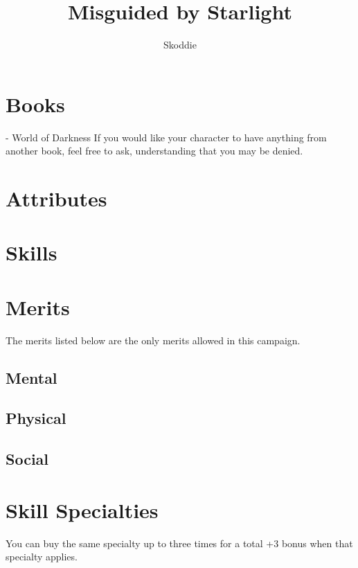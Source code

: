 \documentclass{article}
\title{Misguided by Starlight}
\author{Skoddie}
\begin{document}
\maketitle

\section{Books}
- World of Darkness
If you would like your character to have anything from another book, feel free to ask, understanding that you may be denied.

\section{Attributes}



\section{Skills}



\section{Merits}

The merits listed below are the only merits allowed in this campaign.

\subsection{Mental}
\subsection{Physical}
\subsection{Social}

\section{Skill Specialties}
You can buy the same specialty up to three times for a total +3 bonus when that specialty applies.
\end{document}
